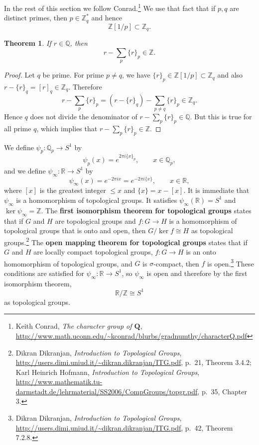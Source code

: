 \documentclass{article}
\newtheorem{theorem}{Theorem}
\theoremstyle{definition}
\begin{document}
In the rest of this section we follow Conrad.\footnote{Keith Conrad, {\em The character group of $\mathbf{Q}$}, \url{http://www.math.uconn.edu/~kconrad/blurbs/gradnumthy/characterQ.pdf}} We use that fact that if $p,q$ are distinct primes, then $p \in \mathbb{Z}_q^*$ and hence
\[
\mathbb{Z}[1/p] \subset \mathbb{Z}_q.
\]

\begin{theorem}
If $r \in \mathbb{Q}$, then
\[
r-\sum_p \{r\}_p \in \mathbb{Z}.
\]
\label{rationaldecomp}
\end{theorem}
\begin{proof}
Let $q$ be prime. For prime $p \neq q$, we have $\{r\}_p \in \mathbb{Z}[1/p] \subset \mathbb{Z}_q$ 
and  also $r-\{r\}_q = [r]_q \in \mathbb{Z}_q$. Therefore
\[
r-\sum_p \{r\}_p = (r-\{r\}_q) - \sum_{p \neq q} \{r\}_p \in \mathbb{Z}_q.
\]
Hence $q$ does not divide the denominator of $r-\sum_p \{r\}_p \in \mathbb{Q}$. But this is true for all prime $q$, which implies that $r-\sum_p \{r\}_p \in \mathbb{Z}$.
\end{proof}

We define $\psi_p:\mathbb{Q}_p \to S^1$ by
\[
\psi_p(x) = e^{2\pi i\{x\}_p}, \qquad x \in \mathbb{Q}_p,
\]
and we define $\psi_\infty:\mathbb{R} \to S^1$ by
\[
\psi_\infty(x)  = e^{-2\pi ix}= e^{-2\pi i\{x\}}, \qquad x \in \mathbb{R},
\]
where $[x]$ is the greatest integer $\leq x$ and $\{x\}=x-[x]$. 
It is immediate that $\psi_\infty$ is a homomorphism of topological groups. It satisfies $\psi_\infty(\mathbb{R})=S^1$ and
$\ker \psi_\infty = \mathbb{Z}$. The \textbf{first isomorphism theorem for topological groups} states that if 
$G$ and $H$ are topological groups and $f:G \to H$ is a homomorphism of topological groups that is onto and open, then
$G/\ker f \cong H$ as topological groups.\footnote{Dikran Dikranjan, {\em Introduction to Topological Groups},
\url{http://users.dimi.uniud.it/~dikran.dikranjan/ITG.pdf}, p.~21, Theorem 3.4.2;
Karl Heinrich Hofmann, {\em Introduction to Topological Groups},
\url{http://www.mathematik.tu-darmstadt.de/lehrmaterial/SS2006/CompGroups/topgr.pdf}, p.~35, Chapter 3.}
The \textbf{open mapping theorem for topological groups} states that if $G$ and $H$ are locally compact topological
groups, $f:G \to H$ is an onto homomorphism of topological groups, and $G$ is $\sigma$-compact, then
$f$ is open.\footnote{Dikran Dikranjan, {\em Introduction to Topological Groups},
\url{http://users.dimi.uniud.it/~dikran.dikranjan/ITG.pdf}, p.~42, Theorem 7.2.8.}
These conditions are satisfied for $\psi_\infty:\mathbb{R} \to S^1$, so $\psi_\infty$ is open and therefore
by the first isomorphism theorem,
\[
\mathbb{R}/\mathbb{Z} \cong S^1
\]
as topological groups.
\end{document}
